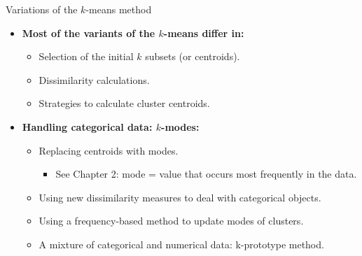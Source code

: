 \documentclass[aspectratio=169,t,xcolor=dvipsnames]{beamer}
\begin{document}
  {
    \begin{frame}{Variations of the $k$-means method}
      \begin{itemize}
        \item \textbf{Most of the variants of the $k$-means differ in:}
        \begin{itemize}
          \item Selection of the initial $k$ subsets (or centroids).
          \item Dissimilarity calculations.
          \item Strategies to calculate cluster centroids.
        \end{itemize}
        \item \textbf{Handling categorical data: $k$-modes:}
        \begin{itemize}
          \item Replacing centroids with modes.
          \begin{itemize}
            \item See Chapter 2: mode = value that occurs most frequently in the data.
          \end{itemize}
          \item Using new dissimilarity measures to deal with categorical objects.
          \item Using a frequency-based method to update modes of clusters.
          \item A mixture of categorical and numerical data: k-prototype method.
        \end{itemize}
      \end{itemize}
    \end{frame}
  }
\end{document}
